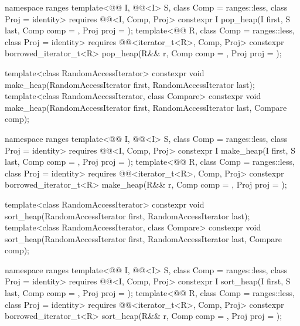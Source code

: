 \begin{codeblock}
{  namespace ranges {
    template<@@ I, @@<I> S, class Comp = ranges::less,
             class Proj = identity>
      requires @@<I, Comp, Proj>
      constexpr I
        pop_heap(I first, S last, Comp comp = {}, Proj proj = {});
    template<@@ R, class Comp = ranges::less, class Proj = identity>
      requires @@<iterator_t<R>, Comp, Proj>
      constexpr borrowed_iterator_t<R>
        pop_heap(R&& r, Comp comp = {}, Proj proj = {});
  }

  template<class RandomAccessIterator>
    constexpr void make_heap(RandomAccessIterator first, RandomAccessIterator last);
  template<class RandomAccessIterator, class Compare>
    constexpr void make_heap(RandomAccessIterator first, RandomAccessIterator last,
                             Compare comp);

  namespace ranges {
    template<@@ I, @@<I> S, class Comp = ranges::less,
             class Proj = identity>
      requires @@<I, Comp, Proj>
      constexpr I
        make_heap(I first, S last, Comp comp = {}, Proj proj = {});
    template<@@ R, class Comp = ranges::less, class Proj = identity>
      requires @@<iterator_t<R>, Comp, Proj>
      constexpr borrowed_iterator_t<R>
        make_heap(R&& r, Comp comp = {}, Proj proj = {});
  }

  template<class RandomAccessIterator>
    constexpr void sort_heap(RandomAccessIterator first, RandomAccessIterator last);
  template<class RandomAccessIterator, class Compare>
    constexpr void sort_heap(RandomAccessIterator first, RandomAccessIterator last,
                             Compare comp);

  namespace ranges {
    template<@@ I, @@<I> S, class Comp = ranges::less,
             class Proj = identity>
      requires @@<I, Comp, Proj>
      constexpr I
        sort_heap(I first, S last, Comp comp = {}, Proj proj = {});
    template<@@ R, class Comp = ranges::less, class Proj = identity>
      requires @@<iterator_t<R>, Comp, Proj>
      constexpr borrowed_iterator_t<R>
        sort_heap(R&& r, Comp comp = {}, Proj proj = {});
  }

}
\end{codeblock}
